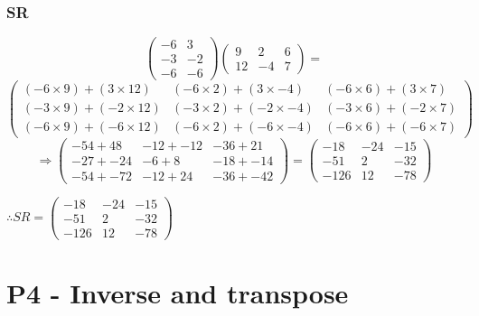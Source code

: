 \documentclass{article}
\begin{document}
\subsubsection{SR}
\[
	\begin{pmatrix}
		-6 & 3\\
		-3 & -2\\
		-6 & -6
	\end{pmatrix}
	\begin{pmatrix}
		9 & 2 & 6\\
		12 & -4 & 7
	\end{pmatrix}
	=
\]
\[
	\begin{pmatrix}
		(-6\times9)+(3\times12) & (-6\times2)+(3\times-4) & (-6\times6)+(3\times7)\\
		(-3\times9)+(-2\times12) & (-3\times2)+(-2\times-4) & (-3\times6)+(-2\times7)\\
		(-6\times9)+(-6\times12) & (-6\times2)+(-6\times-4) & (-6\times6)+(-6\times7)
	\end{pmatrix}

\]
\[
	\Rightarrow
	\begin{pmatrix}
		-54+48 & -12+-12 & -36+21\\
		-27+-24 & -6+8 & -18+-14\\
		-54+-72 & -12+24 & -36+-42
	\end{pmatrix}
	=
	\begin{pmatrix}
		-18 & -24 & -15\\
		-51 & 2 & -32\\
		-126 & 12 & -78
	\end{pmatrix}
\]
\begin{center}\vspace{0.5cm}$\therefore
	SR=
	\begin{pmatrix}
		-18 & -24 & -15\\
		-51 & 2 & -32\\
		-126 & 12 & -78
	\end{pmatrix}
$\end{center}

\section{P4 - Inverse and transpose}
\end{document}
